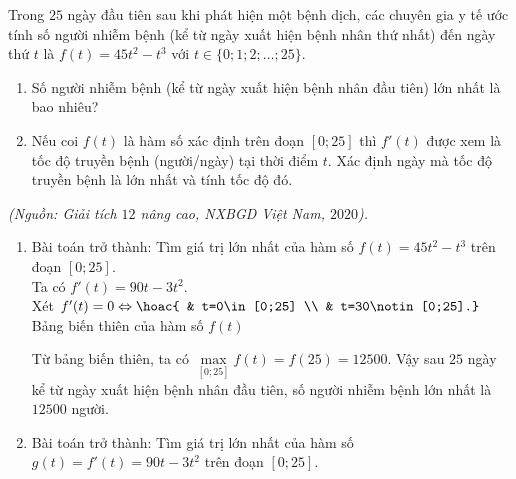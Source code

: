 \begin{bt}%
	Trong $25$ ngày đầu tiên sau khi phát hiện một bệnh dịch, các chuyên gia y tế ước tính số người nhiễm bệnh (kể từ ngày xuất hiện bệnh nhân thứ nhất) đến ngày thứ $t$ là $f(t)=45t^2-t^3$ với $t\in\{0;1;2;\ldots;25\}$.
	\begin{enumerate}
		\item Số người nhiễm bệnh (kể từ ngày xuất hiện bệnh nhân đầu tiên) lớn nhất là bao nhiêu?
		\item Nếu coi $f(t)$ là hàm số xác định trên đoạn $[0;25]$ thì $f'(t)$ được xem là tốc độ truyền bệnh (người/ngày) tại thời điểm $t$. Xác định ngày mà tốc độ truyền bệnh là lớn nhất và tính tốc độ đó.
	\end{enumerate}
	\begin{flushright}
		\textit{(Nguồn: Giải tích $12$ nâng cao, NXBGD Việt Nam, $2020$).}
	\end{flushright}
	\loigiai
	{
		\begin{enumerate}
			\item
			Bài toán trở thành: Tìm giá trị lớn nhất của hàm số $f(t)=45t^2-t^3$ trên đoạn $[0;25]$. \\
			Ta có $f'(t)=90t-3t^2$. \\
			Xét $f'(t)=0 \Leftrightarrow \hoac{ & t=0\in[0;25] \\ & t=30\notin[0;25].}$ \\
			Bảng biến thiên của hàm số $f(t)$
			\begin{center}
			\end{center}
			Từ bảng biến thiên, ta có $\max\limits_{[0;25]} f(t)=f(25)=12500$.
			Vậy sau $25$ ngày kể từ ngày xuất hiện bệnh nhân đầu tiên, số người nhiễm bệnh lớn nhất là $12500$ người.
			\item
			Bài toán trở thành: Tìm giá trị lớn nhất của hàm số $g(t)=f'(t)=90t-3t^2$ trên đoạn $[0;25]$. \\

\end{enumerate}}
\end{bt}
